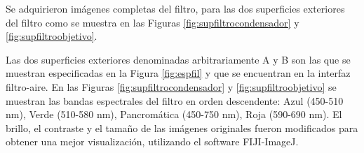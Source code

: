 \hspace{0.5cm}Se adquirieron imágenes completas del filtro, para las dos superficies exteriores del filtro como se muestra en las Figuras \ref{fig:supfiltrocondensador} y \ref{fig:supfiltroobjetivo}.
\begin{figure}[H]
	\begin{floatrow}
	\end{floatrow}
\end{figure}
 Las dos superficies exteriores denominadas arbitrariamente A y B son las que se muestran especificadas en la Figura \ref{fig:espfil} y que se encuentran en la interfaz filtro-aire. En las Figuras \ref{fig:supfiltrocondensador} y \ref{fig:supfiltroobjetivo} se muestran las bandas espectrales del filtro en orden descendente: Azul (450-510 nm), Verde (510-580 nm), Pancromática (450-750 nm), Roja (590-690 nm). El brillo, el contraste y el tamaño de las imágenes originales fueron modificados para obtener una mejor visualización, utilizando el software FIJI-ImageJ. 

